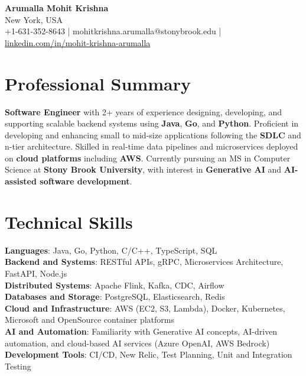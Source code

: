 \documentclass[letterpaper,11pt]{article}
\begin{document}
\begin{center}
  {\Large \textbf{Arumalla Mohit Krishna}} \\
  New York, USA \\
  +1-631-352-8643 \enspace | \enspace mohitkrishna.arumalla@stonybrook.edu \enspace | \enspace \href{https://www.linkedin.com/in/mohit-krishna-arumalla}{linkedin.com/in/mohit-krishna-arumalla}
\end{center}

\section{Professional Summary}
  \begin{itemize}[leftmargin=0.15in, label={}]
    \small{\item{
     \textbf{Software Engineer} with 2+ years of experience designing, developing, and supporting scalable backend systems using \textbf{Java}, \textbf{Go}, and \textbf{Python}. Proficient in developing and enhancing small to mid-size applications following the \textbf{SDLC} and n-tier architecture. Skilled in real-time data pipelines and microservices deployed on \textbf{cloud platforms} including \textbf{AWS}. Currently pursuing an MS in Computer Science at \textbf{Stony Brook University}, with interest in \textbf{Generative AI} and \textbf{AI-assisted software development}.
    }}
  \end{itemize}
\vspace{-16pt}

\section{Technical Skills}
 \begin{itemize}[leftmargin=0.15in, label={}]
    \small{\item{
     \textbf{Languages}: Java, Go, Python, C/C++, TypeScript, SQL \\
     \textbf{Backend and Systems}: RESTful APIs, gRPC, Microservices Architecture, FastAPI, Node.js \\
     \textbf{Distributed Systems}: Apache Flink, Kafka, CDC, Airflow \\
     \textbf{Databases and Storage}: PostgreSQL, Elasticsearch, Redis \\
     \textbf{Cloud and Infrastructure}: AWS (EC2, S3, Lambda), Docker, Kubernetes, Microsoft and OpenSource container platforms \\
     \textbf{AI and Automation}: Familiarity with Generative AI concepts, AI-driven automation, and cloud-based AI services (Azure OpenAI, AWS Bedrock) \\
     \textbf{Development Tools}: CI/CD, New Relic, Test Planning, Unit and Integration Testing
    }}
 \end{itemize}
\vspace{-16pt}
\end{document}
